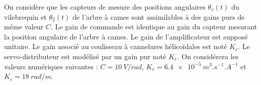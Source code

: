 \documentclass[10pt,fleqn]{article} %
\begin{document}
\begin{multicols}{2}
\begin{center}
{}
%
\end{center}

 On considère que les capteurs de mesure des positions angulaires $\theta_{v}(t)$ du vilebrequin et $\theta_{2}(t)$ de l'arbre à cames sont assimilables à des gains purs de même valeur $C$. Le gain de commande est identique au gain du capteur mesurant la position angulaire de l'arbre à cames. Le gain de l'amplificateur est supposé unitaire. Le gain associé au coulisseau à cannelures hélicoïdales est noté $K_{c}$. Le servo-distributeur est modélisé par un gain pur noté $K_{e}$. On considérera les valeurs numériques suivantes : $C=\SI{10}{V/rad}$, $K_e=\SI{6.4e-5}{m^3.s^{-1}.A^{-1}}$  et  $K_{c}=\SI{18}{rad/m}$.




\end{multicols}
\end{document}
